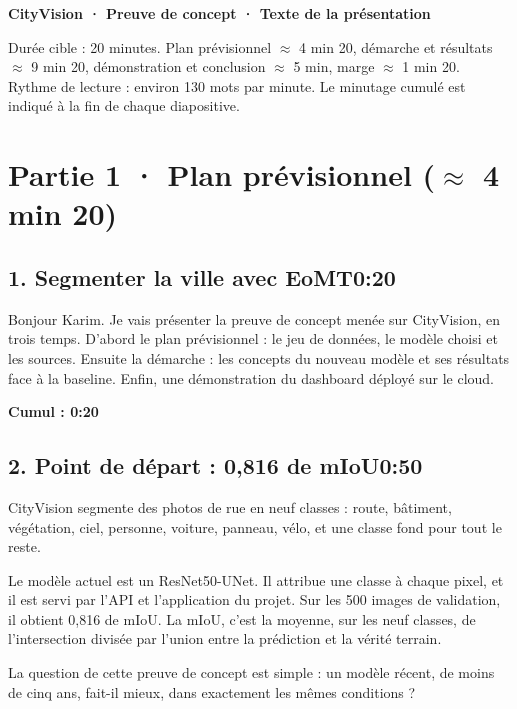\documentclass[11pt,a4paper]{article}
\newcommand{\cumul}[1]{\par{\hfill\small\color{accent}\bfseries #1}\par}
\newcommand{\tempo}[1]{\hfill{\normalsize\color{accent}#1}}
\begin{document}
\RaggedRight

{\LARGE\bfseries\color{navy}CityVision · Preuve de concept · Texte de la présentation\par}\vspace{4mm}

Durée cible : 20 minutes. Plan prévisionnel $\approx$ 4 min 20, démarche et résultats $\approx$ 9 min 20, démonstration et conclusion $\approx$ 5 min, marge $\approx$ 1 min 20.
Rythme de lecture : environ 130 mots par minute. Le minutage cumulé est indiqué à la fin de chaque diapositive.

\medskip{\color{linec}\rule{\linewidth}{0.5pt}}\medskip

\section*{Partie 1 · Plan prévisionnel ($\approx$ 4 min 20)}

\subsection*{1. Segmenter la ville avec EoMT\tempo{0:20}}

Bonjour Karim. Je vais présenter la preuve de concept menée sur CityVision, en trois temps. D'abord le plan prévisionnel : le jeu de données, le modèle choisi et les sources. Ensuite la démarche : les concepts du nouveau modèle et ses résultats face à la baseline. Enfin, une démonstration du dashboard déployé sur le cloud.

\cumul{Cumul : 0:20}

\subsection*{2. Point de départ : 0,816 de mIoU\tempo{0:50}}

CityVision segmente des photos de rue en neuf classes : route, bâtiment, végétation, ciel, personne, voiture, panneau, vélo, et une classe fond pour tout le reste.

Le modèle actuel est un ResNet50-UNet. Il attribue une classe à chaque pixel, et il est servi par l'API et l'application du projet. Sur les 500 images de validation, il obtient 0,816 de mIoU. La mIoU, c'est la moyenne, sur les neuf classes, de l'intersection divisée par l'union entre la prédiction et la vérité terrain.

La question de cette preuve de concept est simple : un modèle récent, de moins de cinq ans, fait-il mieux, dans exactement les mêmes conditions ?
\end{document}
